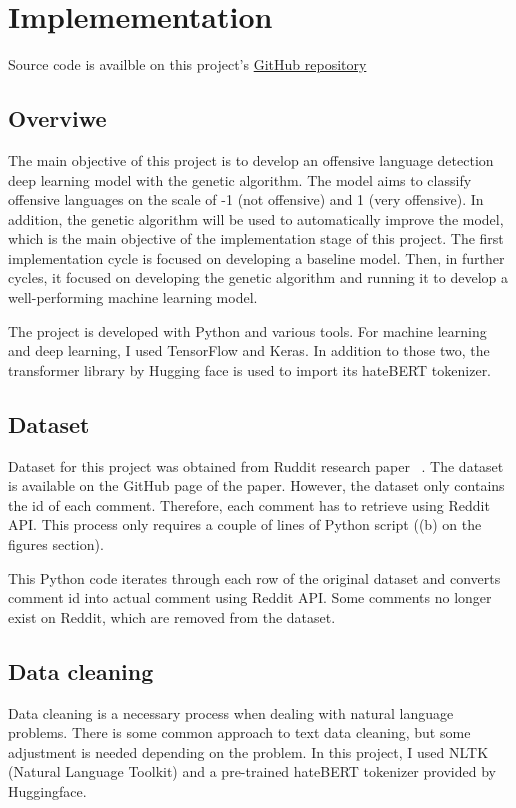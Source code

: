 \documentclass[11pt, natbib=false]{article}
\begin{document}
\section{Implemementation}
Source code is availble on this project's \href{https://github.com/hayacon/cs_final_project}{GitHub repository}
\subsection{Overviwe}
The main objective of this project is to develop an offensive language detection deep learning model with the genetic algorithm.
The model aims to classify offensive languages on the scale of -1 (not offensive) and 1 (very offensive).
In addition, the genetic algorithm will be used to automatically improve the model, which is the main objective of the implementation stage of this project.
The first implementation cycle is focused on developing a baseline model.
Then, in further cycles, it focused on developing the genetic algorithm and running it to develop a well-performing machine learning model.

The project is developed with Python and various tools.
For machine learning and deep learning, I used TensorFlow and Keras.
In addition to those two, the transformer library by Hugging face is used to import its hateBERT tokenizer.

\subsection{Dataset}
Dataset for this project was obtained from Ruddit research paper ~\cite{hada2021ruddit}.
The dataset is available on the GitHub page of the paper.
However, the dataset only contains the id of each comment.
Therefore, each comment has to retrieve using Reddit API.
This process only requires a couple of lines of Python script ((b) on the figures section).

This Python code iterates through each row of the original dataset and converts comment id into actual comment using Reddit API.
Some comments no longer exist on Reddit, which are removed from the dataset.

\subsection{Data cleaning}
Data cleaning is a necessary process when dealing with natural language problems.
There is some common approach to text data cleaning, but some adjustment is needed depending on the problem.
In this project, I used NLTK (Natural Language Toolkit) and a pre-trained hateBERT tokenizer provided by Huggingface.
\end{document}
